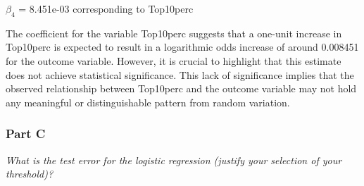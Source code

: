 \documentclass[
]{article}
\begin{document}
\(\beta_4\) = 8.451e-03 corresponding to Top10perc

The coefficient for the variable Top10perc suggests that a one-unit
increase in Top10perc is expected to result in a logarithmic odds
increase of around 0.008451 for the outcome variable. However, it is
crucial to highlight that this estimate does not achieve statistical
significance. This lack of significance implies that the observed
relationship between Top10perc and the outcome variable may not hold any
meaningful or distinguishable pattern from random variation.

\hypertarget{part-c-3}{%
\subsubsection{Part C}\label{part-c-3}}

\emph{What is the test error for the logistic regression (justify your
selection of your threshold)?}
\end{document}
